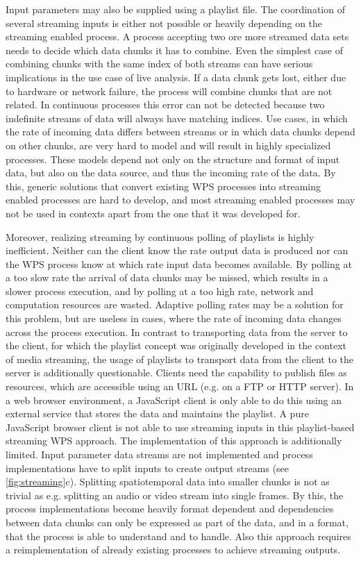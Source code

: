 Input parameters may also be supplied using a playlist file. The coordination of several streaming inputs is either not possible or heavily depending on the streaming enabled process. A process accepting two ore more streamed data sets needs to decide which data chunks it has to combine. Even the simplest case of combining chunks with the same index of both streams can have serious implications in the use case of live analysis. If a data chunk gets lost, either due to hardware or network failure, the process will combine chunks that are not related. In continuous processes this error can not be detected because two indefinite streams of data will always have matching indices. Use cases, in which the rate of incoming data differs between streams or in which data chunks depend on other chunks, are very hard to model and will result in highly specialized processes. These models depend not only on the structure and format of input data, but also on the data source, and thus the incoming rate of the data. By this, generic solutions that convert existing \ac{WPS} processes into streaming enabled processes are hard to develop, and most streaming enabled processes may not be used in contexts apart from the one that it was developed for.

Moreover, realizing streaming by continuous polling of playlists is highly inefficient. Neither can the client know the rate output data is produced nor can the \ac{WPS} process know at which rate input data becomes available. By polling at a too slow rate the arrival of data chunks may be missed, which results in a slower process execution, and by polling at a too high rate, network and computation resources are wasted. Adaptive polling rates may be a solution for this problem, but are useless in cases, where the rate of incoming data changes across the process execution. In contrast to transporting data from the server to the client, for which the playlist concept was originally developed in the context of media streaming, the usage of playlists to transport data from the client to the server is additionally questionable. Clients need the capability to publish files as resources, which are accessible using an URL (e.g. on a FTP or HTTP server). In a web browser environment, a JavaScript client is only able to do this using an external service that stores the data and maintains the playlist. A pure JavaScript browser client is not able to use streaming inputs in this playlist-based streaming \ac{WPS} approach. The implementation of this approach is additionally limited. Input parameter data streams are not implemented and process implementations have to split inputs to create output streams (see \cref{fig:streaming}c). Splitting spatiotemporal data into smaller chunks is not as trivial as e.g. splitting an audio or video stream into single frames. By this, the process implementations become heavily format dependent and dependencies between data chunks can only be expressed as part of the data, and in a format, that the process is able to understand and to handle. Also this approach requires a reimplementation of already existing processes to achieve streaming outputs.

